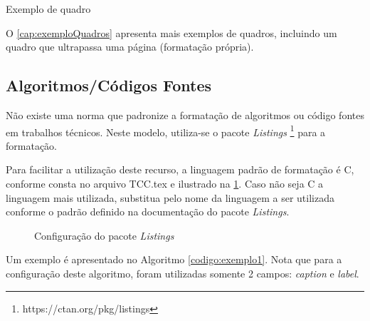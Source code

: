\begin{quadro}[!ht]
	\caption{\label{quad:exemplo} Exemplo de quadro}
	\end{quadro}

O \autoref{cap:exemploQuadros} apresenta mais exemplos de quadros, incluindo um quadro que ultrapassa uma página (formatação própria). 

\subsection{Algoritmos/Códigos Fontes}    
    
Não existe uma norma que padronize a formatação de algoritmos ou código fontes em trabalhos técnicos. Neste modelo, utiliza-se o pacote \textit{Listings} \footnote{https://ctan.org/pkg/listings} para a formatação. 

Para facilitar a utilização deste recurso, a linguagem padrão de formatação é C, conforme consta no arquivo TCC.tex e ilustrado na  \ref{fig:linguagem}. Caso não seja C a linguagem mais utilizada, substitua pelo nome da linguagem a ser utilizada conforme o padrão definido na documentação do pacote \textit{Listings}.

\begin{figure}[!ht]
\centering 
\caption{Configuração do pacote \textit{Listings}}
\label{fig:linguagem}
\end{figure}

Um exemplo é apresentado no Algoritmo \ref{codigo:exemplo1}. Nota que para a configuração deste algoritmo, foram utilizadas somente 2 campos: \textit{caption} e \textit{label}. 

